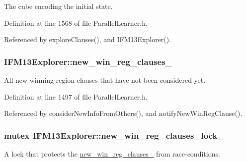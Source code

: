 The cube encoding the initial state. 



Definition at line 1568 of file Parallel\-Learner.\-h.



Referenced by explore\-Clauses(), and I\-F\-M13\-Explorer().

\hypertarget{classIFM13Explorer_a712b3dc6c099b1e3697e7b8877e0cd90}{
\subsubsection[{new\-\_\-win\-\_\-reg\-\_\-clauses\-\_\-}]{ I\-F\-M13\-Explorer\-::new\-\_\-win\-\_\-reg\-\_\-clauses\-\_\-\hspace{0.3cm}{\ttfamily [protected]}}}\label{classIFM13Explorer_a712b3dc6c099b1e3697e7b8877e0cd90}


All new winning region clauses that have not been considered yet. 



Definition at line 1497 of file Parallel\-Learner.\-h.



Referenced by consider\-New\-Info\-From\-Others(), and notify\-New\-Win\-Reg\-Clause().

\hypertarget{classIFM13Explorer_a2e2722cb76399e087f62445b959ff5ed}{
\subsubsection[{new\-\_\-win\-\_\-reg\-\_\-clauses\-\_\-lock\-\_\-}]{\setlength{\rightskip}{0pt plus 5cm}mutex I\-F\-M13\-Explorer\-::new\-\_\-win\-\_\-reg\-\_\-clauses\-\_\-lock\-\_\-\hspace{0.3cm}{\ttfamily [protected]}}}\label{classIFM13Explorer_a2e2722cb76399e087f62445b959ff5ed}


A lock that protects the \hyperlink{classIFM13Explorer_a712b3dc6c099b1e3697e7b8877e0cd90}{new\-\_\-win\-\_\-reg\-\_\-clauses\-\_\-} from race-\/conditions. 

